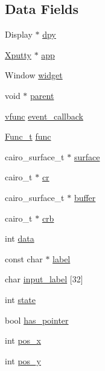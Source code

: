 \subsection*{Data Fields}
\begin{DoxyCompactItemize}
\item 
Display $\ast$ \hyperlink{structWidget__t_a5ae8f0fdd24c6baf15173dc0cc9ae360}{dpy}
\item 
\hyperlink{structXputty}{Xputty} $\ast$ \hyperlink{structWidget__t_a06eaa5b134c47983fd965e745cdbaa3b}{app}
\item 
Window \hyperlink{structWidget__t_acb2bfb41674371ee1220a9d6a2d89fb1}{widget}
\item 
void $\ast$ \hyperlink{structWidget__t_a483f6517c19fe09e1bf2eaec6646a14b}{parent}
\item 
\hyperlink{xwidget_8h_a6423c133fb634585762a77dda34befab}{vfunc} \hyperlink{structWidget__t_af0adf855c1991d11f59c5b6f9a2c526a}{event\+\_\+callback}
\item 
\hyperlink{structFunc__t}{Func\+\_\+t} \hyperlink{structWidget__t_a225b9a175e132994a5aa73b59a2911ad}{func}
\item 
cairo\+\_\+surface\+\_\+t $\ast$ \hyperlink{structWidget__t_ae9b5979742ea31817ff7d7b34a56f88d}{surface}
\item 
cairo\+\_\+t $\ast$ \hyperlink{structWidget__t_a26594f6ffabe98fc08f9207150fc9417}{cr}
\item 
cairo\+\_\+surface\+\_\+t $\ast$ \hyperlink{structWidget__t_a84d225e7b261d67daa764b47c8c62107}{buffer}
\item 
cairo\+\_\+t $\ast$ \hyperlink{structWidget__t_ad98022ee160d4c0906110868fc9e5664}{crb}
\item 
int \hyperlink{structWidget__t_a9dd7b58be77bf31ab021aa627a73186a}{data}
\item 
const char $\ast$ \hyperlink{structWidget__t_a952020107ac1f6d9a37b4f978f77b61c}{label}
\item 
char \hyperlink{structWidget__t_ac5cb454301472edeb16e563ef2149dbb}{input\+\_\+label} \mbox{[}32\mbox{]}
\item 
int \hyperlink{structWidget__t_aaa935b64805fdeb78acb015c67d6638c}{state}
\item 
bool \hyperlink{structWidget__t_ac8c396c698d816afad49fa751c3ca2c8}{has\+\_\+pointer}
\item 
int \hyperlink{structWidget__t_ae2d46ffb30bb2335a043d138fa05e1a3}{pos\+\_\+x}
\item 
int \hyperlink{structWidget__t_a9b127ac6b3f017b367351ee673e063c3}{pos\+\_\+y}

\end{DoxyCompactItemize}
